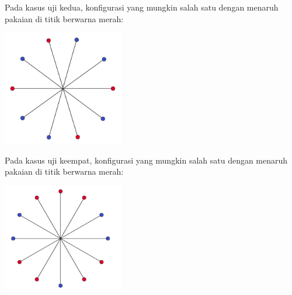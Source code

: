 \documentclass{article}
\begin{document}
Pada kasus uji kedua, konfigurasi yang mungkin salah satu dengan menaruh pakaian di titik berwarna merah:

\includegraphics[width=200px]{sample-2}

Pada kasus uji keempat, konfigurasi yang mungkin salah satu dengan menaruh pakaian di titik berwarna merah:

\includegraphics[width=200px]{sample-4}
\end{document}
